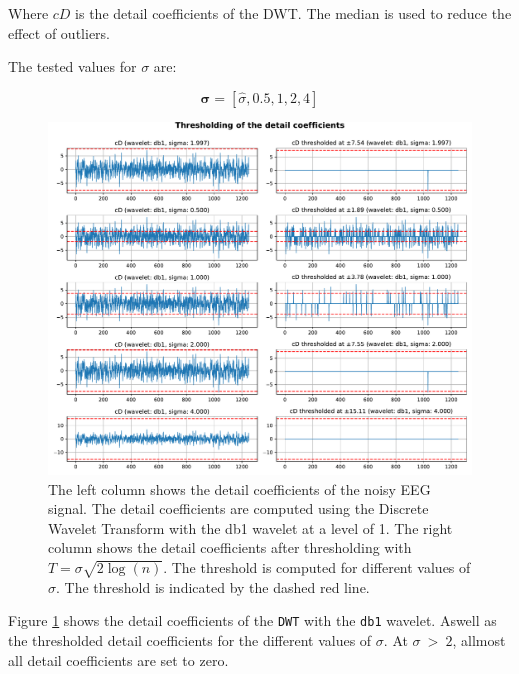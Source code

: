 Where $cD$ is the detail coefficients of the DWT. The median is used to reduce the effect of outliers.

The tested values for $\sigma$ are:

\begin{equation}
    \mathbf{\sigma} = [ \hat{\sigma}, 0.5, 1, 2, 4 ]
\end{equation}

\begin{figure}[H]
    \centering
    \includegraphics[width=\textwidth]{./img/problem3-thresholding-of-detail-coefficients.pdf}
    \caption{The left column shows the detail coefficients of the noisy EEG signal. The detail coefficients are computed using the Discrete Wavelet Transform with the \textrm{db1} wavelet at a level of 1. The right column shows the detail coefficients after thresholding with $T = \sigma \sqrt{2 \log(n)}$. The threshold is computed for different values of $\sigma$. The threshold is indicated by the dashed red line.}
    \label{fig:problem3thresholding}
\end{figure}

Figure \ref{fig:problem3thresholding} shows the detail coefficients of the \texttt{DWT} with the \texttt{db1} wavelet. Aswell as the thresholded detail coefficients for the different values of $\sigma$. At $\sigma\ >\ 2$, allmost all detail coefficients are set to zero. 



